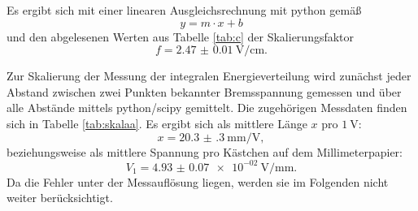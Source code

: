 Es ergibt sich mit einer linearen Ausgleichsrechnung mit python \cite{python} gemäß
\begin{equation*}
	y = m \cdot x + b
\end{equation*}
und den abgelesenen Werten aus Tabelle \ref{tab:c} der Skalierungsfaktor 
\begin{equation*}
	f = \SI{2.47(1)}{\volt\per\centi\meter} \mathrm{.}
\end{equation*}

Zur Skalierung der Messung der integralen Energieverteilung wird zunächst jeder Abstand zwischen zwei Punkten bekannter Bremsspannung gemessen und über alle Abstände mittels python/scipy \cite{scipy} gemittelt.
Die zugehörigen Messdaten finden sich in Tabelle \ref{tab:skalaa}.
Es ergibt sich als mittlere Länge $x$ pro $\SI{1}{\volt}$:
\begin{equation}
	x=\SI{20.3(3)}{\milli\meter\per\volt} \mathrm{,}
\end{equation}
beziehungsweise als mittlere Spannung pro Kästchen auf dem Millimeterpapier:
\begin{equation}
	V_1= \SI{4.93(7)e-02}{\volt\per\milli\meter} \mathrm{.}
\end{equation}
Da die Fehler unter der Messauflösung liegen, werden sie im Folgenden nicht weiter berücksichtigt.

